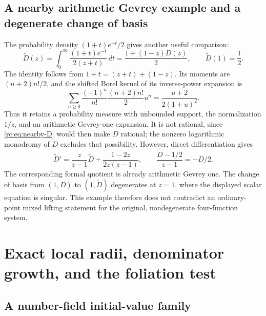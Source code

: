 \documentclass[11pt,a4paper]{article}
\theoremstyle{definition}
\theoremstyle{remark}
\theoremstyle{plain}
\numberwithin{equation}{section}
\begin{document}
\subsection{A nearby arithmetic Gevrey example and a degenerate change of basis}

The probability density $(1+t)e^{-t}/2$ gives another useful comparison:
\begin{equation}\label{rc:eq:nearby-D}
 \widetilde D(z)=\int_0^\infty\frac{(1+t)e^{-t}}{2(z+t)}\,dt
 =\frac{1+(1-z)D(z)}2,\qquad\widetilde D(1)=\frac12.
\end{equation}
The identity follows from $1+t=(z+t)+(1-z)$.  Its moments are
$(n+2)n!/2$, and the shifted Borel kernel of its inverse-power expansion
is
\[
 \sum_{n\ge0}\frac{(-1)^n}{n!}\frac{(n+2)n!}{2}u^n
 =\frac{u+2}{2(1+u)^2}.
\]
Thus it retains a probability measure with unbounded support, the
normalization $1/z$, and an arithmetic Gevrey-one expansion.  It is not
rational, since \eqref{rc:eq:nearby-D} would then make $D$ rational;
the nonzero logarithmic monodromy of $D$ excludes that possibility.
However, direct differentiation gives
\[
 \widetilde D'=\frac z{z-1}\widetilde D+
                         \frac{1-2z}{2z(z-1)},\qquad
 \frac{\widetilde D-1/2}{z-1}=-D/2.
\]
The corresponding formal quotient is already arithmetic Gevrey one.
The change of basis from $(1,D)$ to $(1,\widetilde D)$ degenerates at
$z=1$, where the displayed scalar equation is singular.  This example
therefore does not contradict an ordinary-point mixed lifting statement
for the original, nondegenerate four-function system.

\section{Exact local radii, denominator growth, and the foliation test}
\label{rc:sec:adelic}

\subsection{A number-field initial-value family}
\end{document}

